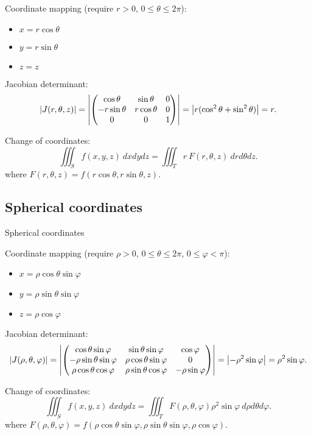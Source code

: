 Coordinate mapping (require \(r>0\), \(0\leq \theta \leq 2\pi\)):
\begin{itemize}
    \item \(x = r \cos \theta\)
    \item \(y = r \sin \theta\)
    \item \(z = z\)
\end{itemize}



Jacobian determinant:
\[
    \left|J(r,\theta,z)\right|
    =
    \left|\begin{pmatrix}
            \cos \theta    & \sin \theta   & 0 \\
            -r \sin \theta & r \cos \theta & 0 \\
            0              & 0             & 1
        \end{pmatrix}\right|
    =
    \left|r (\cos^2 \theta + \sin^2 \theta)\right|
    = r.
\]

Change of coordinates:
\[
    \iiint_{S} f(x,y,z) \ dxdydz =  \iiint_{T} r \ F(r,\theta,z)   \ dr d\theta dz.
\]
where \( F(r,\theta,z) = f(r \cos \theta, r \sin \theta,  z) \).




\subsection{Spherical coordinates}


{Spherical coordinates}

Coordinate mapping (require \(\rho>0\), \(0\leq \theta \leq 2\pi\), \(0\leq \varphi <\pi\)):
\begin{itemize}
    \item \(x = \rho \cos \theta \sin \varphi\)
    \item \(y = \rho \sin \theta \sin \varphi\)
    \item \(z = \rho \cos \varphi\)
\end{itemize}



Jacobian determinant:
\[
    \left|J(\rho,\theta,\varphi)\right|
    =
    \left|\begin{pmatrix}
            \cos \theta \sin \varphi       & \sin \theta \sin \varphi      & \cos \varphi        \\
            -\rho \sin \theta \sin \varphi & \rho \cos \theta \sin \varphi & 0                   \\
            \rho \cos \theta \cos \varphi  & \rho \sin \theta \cos \varphi & - \rho \sin \varphi
        \end{pmatrix}\right|
    =
    \left|- \rho^2 \sin \varphi\right|
    = \rho^2 \sin \varphi.
\]

Change of coordinates:
\[
    \iiint_{S} f(x,y,z) \ dxdydz =  \iiint_{T}  F(\rho,\theta,\varphi) \rho^2 \sin \varphi  \ d\rho d\theta d\varphi.
\]
where \(F(\rho,\theta,\varphi) = f(\rho \cos \theta \sin \varphi, \rho \sin \theta \sin \varphi,   \rho \cos \varphi  ) \).